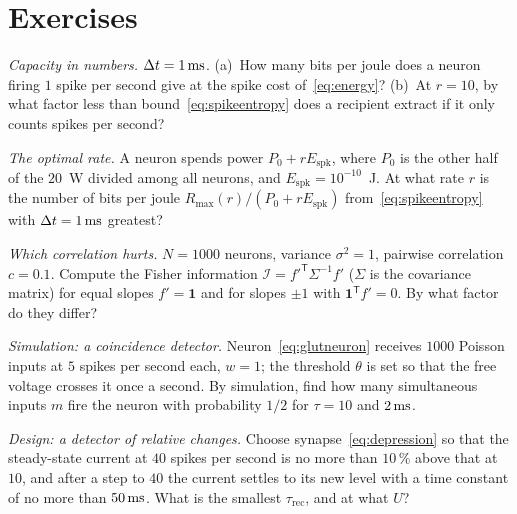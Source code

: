 \section{Exercises}

\begin{exercise}[\lvlA]
\label{ex:04:1}
\emph{Capacity in numbers.} $\Delta t=1\,\text{ms}$. (a)~How many bits per joule does a neuron firing $1$ spike per second give at the spike cost of~\eqref{eq:energy}? (b)~At $r=10$, by what factor less than bound~\eqref{eq:spikeentropy} does a recipient extract if it only counts spikes per second?
\end{exercise}

\begin{exercise}[\lvlB]
\label{ex:04:2}
\emph{The optimal rate.} A neuron spends power $P_0+rE_{\text{spk}}$, where $P_0$ is the other half of the $20$~W divided among all neurons, and $E_{\text{spk}}=10^{-10}$~J. At what rate $r$ is the number of bits per joule $R_{\max}(r)/(P_0+rE_{\text{spk}})$ from~\eqref{eq:spikeentropy} with $\Delta t=1\,\text{ms}$ greatest?
\end{exercise}

\begin{exercise}[\lvlB]
\label{ex:04:3}
\emph{Which correlation hurts.} $N=1000$ neurons, variance $\sigma^2=1$, pairwise correlation $c=0.1$. Compute the Fisher information $\mathcal I=f'^{\mathsf T}\Sigma^{-1}f'$ ($\Sigma$ is the covariance matrix) for equal slopes $f'=\mathbf 1$ and for slopes $\pm1$ with $\mathbf 1^{\mathsf T}f'=0$. By what factor do they differ?
\end{exercise}

\begin{exercise}[\lvlB]
\label{ex:04:4}
\emph{Simulation: a coincidence detector.} Neuron~\eqref{eq:glutneuron} receives $1000$ Poisson inputs at $5$ spikes per second each, $w=1$; the threshold $\theta$ is set so that the free voltage crosses it once a second. By simulation, find how many simultaneous inputs $m$ fire the neuron with probability $1/2$ for $\tau=10$ and $2\,\text{ms}$.
\end{exercise}

\begin{exercise}[\lvlB]
\label{ex:04:5}
\emph{Design: a detector of relative changes.} Choose synapse~\eqref{eq:depression} so that the steady-state current at $40$ spikes per second is no more than $10\,\%$ above that at $10$, and after a step to $40$ the current settles to its new level with a time constant of no more than $50\,\text{ms}$. What is the smallest $\tau_{\text{rec}}$, and at what $U$?
\end{exercise}

